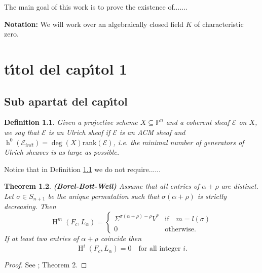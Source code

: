 \documentclass[a4paper,10pt]{book}
\newtheorem{defn0}{Definition}[chapter]
\newtheorem{thm0}[defn0]{Theorem}
\newenvironment{definition}{ \begin{defn0}}{\end{defn0}}
\newenvironment{theorem}{\bigskip \begin{thm0}}{\end{thm0}}
\newcommand{\cE}{{\mathcal E}}
\newcommand {\PP}{\mathbb{P}}
\DeclareMathOperator{\Hl}{H}
\DeclareMathOperator{\h}{h}
\begin{document}
\newpage
{}
 \setcounter{page}{0}
\tableofcontents
\newpage \thispagestyle{empty}


\pagestyle{fancy}
\newpage \thispagestyle{empty}


The main goal of this work is to prove the existence of.......



\vspace{3mm}

{\bf Notation:} We will work over an algebraically closed field $K$ of characteristic zero.

\mainmatter
\chapter[titol abreujat 1]{t\'{\i}tol del cap\'{\i}tol 1}
\section{Sub apartat del cap\'{\i}tol}

\begin{definition}  \label{ulrich}  \rm Given a projective scheme $X\subseteq \PP^n$ and a coherent sheaf $\cE$ on $X$, we say that
$\cE$ is an \emph{Ulrich sheaf} if  $\cE$ is an ACM sheaf and $\h^0(\cE_{init})=\deg(X)\mbox{rank}(\cE)$, i.e. the minimal
number of generators of Ulrich sheaves is as large as possible.
\end{definition}


Notice that in Definition \ref{ulrich} we do not require......

\vspace{3mm}


\begin{theorem}{\bf (Borel-Bott-Weil)}
\label{bottLine}
Assume that all entries of $\alpha+\rho$ are distinct.  Let $\sigma \in S_{n+1}$ be the unique permutation such
    that $\sigma(\alpha+\rho)$ is strictly decreasing. Then
\[ \Hl^m(F_c, L_{\alpha})= \left \{ \begin{array}{ll}
\Sigma^{\sigma(\alpha+\rho)-\rho} V^* & \mbox{if} \quad m=l(\sigma) \\
0 &\mbox{otherwise.}
 \end{array} \right. \]
If at least two entries of $\alpha + \rho $ coincide then $$
\Hl^{i}(F_c, L_{\alpha})= 0 \quad \mbox{for all integer } i.$$
\end{theorem}
\begin{proof}  See \cite{D}; Theorem 2.
\end{proof}
\end{document}

